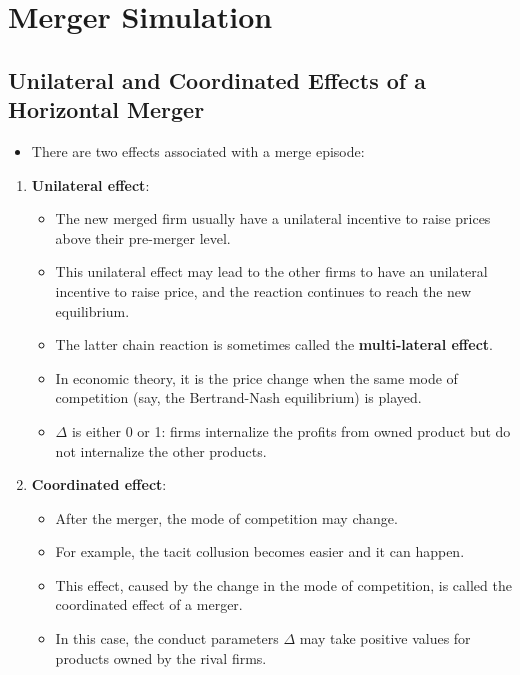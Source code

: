 \documentclass[]{book}
\providecommand{\tightlist}{%
  \setlength{\itemsep}{0pt}\setlength{\parskip}{0pt}}
\begin{document}
\section{Merger Simulation}\label{merger-simulation}

\subsection{Unilateral and Coordinated Effects of a Horizontal
Merger}\label{unilateral-and-coordinated-effects-of-a-horizontal-merger}

\begin{itemize}
\tightlist
\item
  There are two effects associated with a merge episode:
\end{itemize}

\begin{enumerate}
\def\labelenumi{\arabic{enumi}.}
\tightlist
\item
  \textbf{Unilateral effect}:

  \begin{itemize}
  \tightlist
  \item
    The new merged firm usually have a unilateral incentive to raise
    prices above their pre-merger level.
  \item
    This unilateral effect may lead to the other firms to have an
    unilateral incentive to raise price, and the reaction continues to
    reach the new equilibrium.
  \item
    The latter chain reaction is sometimes called the
    \textbf{multi-lateral effect}.
  \item
    In economic theory, it is the price change when the same mode of
    competition (say, the Bertrand-Nash equilibrium) is played.
  \item
    \(\Delta\) is either 0 or 1: firms internalize the profits from
    owned product but do not internalize the other products.
  \end{itemize}
\item
  \textbf{Coordinated effect}:

  \begin{itemize}
  \tightlist
  \item
    After the merger, the mode of competition may change.
  \item
    For example, the tacit collusion becomes easier and it can happen.
  \item
    This effect, caused by the change in the mode of competition, is
    called the coordinated effect of a merger.
  \item
    In this case, the conduct parameters \(\Delta\) may take positive
    values for products owned by the rival firms.
  \end{itemize}
\end{enumerate}
\end{document}
